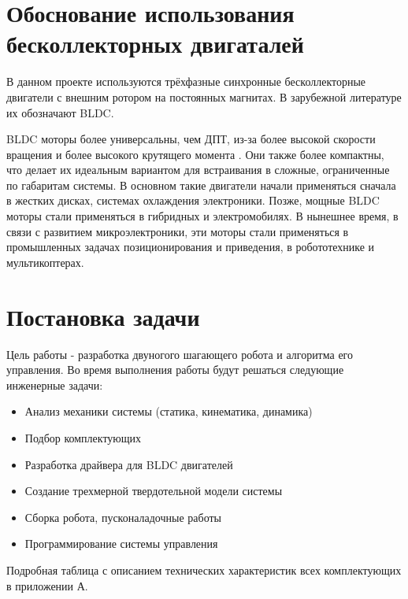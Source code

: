 \section{Обоснование использования бесколлекторных двигаталей}

В данном проекте используются трёхфазные синхронные бесколлекторные двигатели с внешним ротором на постоянных магнитах. В зарубежной литературе их обозначают BLDC.

BLDC моторы более универсальны, чем ДПТ, из-за более высокой скорости вращения и более высокого крутящего момента \cite{Derammelaere2016}. Они также более компактны, что делает их идеальным вариантом для встраивания в сложные, ограниченные по габаритам системы. В основном такие двигатели начали применяться сначала в жестких дисках, системах охлаждения электроники. Позже, мощные BLDC моторы стали применяться в гибридных и электромобилях. В нынешнее время, в связи с развитием микроэлектроники, эти моторы стали применяться в промышленных задачах позиционирования и приведения, в робототехнике и мультикоптерах.

\section{Постановка задачи}

Цель работы - разработка двуногого шагающего робота и алгоритма его управления. Во время выполнения работы будут решаться следующие инженерные задачи:

\begin{itemize}
    \item Анализ механики системы (статика, кинематика, динамика)
    \item Подбор комплектующих
    \item Разработка драйвера для BLDC двигателей
    \item Создание трехмерной твердотельной модели системы
    \item Сборка робота, пусконаладочные работы
    \item Программирование системы управления
\end{itemize}

Подробная таблица с описанием технических характеристик всех комплектующих в приложении А.%